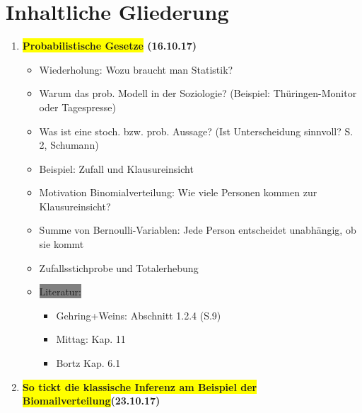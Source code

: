 \documentclass[a4paper,fontsize=16pt]{article}
\begin{document}
\section{Inhaltliche Gliederung}
\begin{enumerate}
   \item{ \textbf{\colorbox{yellow}{Probabilistische Gesetze} (16.10.17)}
   \begin{itemize}
      \item{Wiederholung: Wozu braucht man Statistik?}
      \item{Warum das prob. Modell in der Soziologie? (Beispiel: Thüringen-Monitor oder Tagespresse)}
      \item{Was ist eine stoch. bzw. prob. Aussage? (Ist Unterscheidung sinnvoll? S. 2, Schumann)}
      \item{Beispiel: Zufall und Klausureinsicht}
      \item{Motivation Binomialverteilung: Wie viele Personen kommen zur Klausureinsicht?}
      \item{Summe von Bernoulli-Variablen: Jede Person entscheidet unabhängig, ob sie kommt}
      \item{Zufallsstichprobe und Totalerhebung}
       \item{\colorbox{gray}{Literatur:} 
       \begin{itemize}
       \item{ Gehring+Weins: Abschnitt 1.2.4 (S.9)}
       \item{Mittag: Kap. 11}
       \item{Bortz Kap. 6.1}
       \end{itemize}}
   \end{itemize}
   }
   \item{ \textbf{\colorbox{yellow}{So tickt die klassische Inferenz am Beispiel der Biomailverteilung}(23.10.17)
  }
     
}
\end{enumerate}
\end{document}
